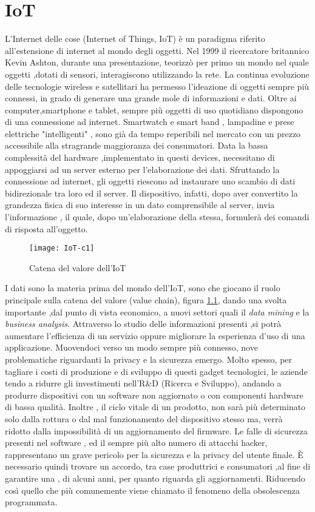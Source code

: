 \chapter{IoT}
L'Internet delle cose (Internet of Things, IoT) è un paradigma riferito
all’estensione di internet al mondo degli oggetti. Nel 1999 il ricercatore
britannico Kevin Ashton, durante una presentazione, teorizzò  per primo un mondo
nel quale oggetti ,dotati di sensori, interagiscono utilizzando la rete.  La
continua evoluzione delle tecnologie wireless e satellitari ha permesso
l'ideazione di oggetti sempre più connessi, in grado di generare una grande mole
di informazioni e dati. Oltre ai computer,smartphone e tablet, sempre più
oggetti di uso quotidiano dispongono di una connessione ad internet. Smartwatch
e smart band , lampadine e prese elettriche "intelligenti" ,  sono già da tempo
reperibili nel mercato\bx{,} con un prezzo accessibile alla stragrande maggioranza dei
consumatori.  Data la bassa
complessità del hardware ,implementato in questi devices, necessitano di
appoggiarsi ad un server esterno per l'elaborazione dei dati.  Sfruttando la
connessione ad internet, gli oggetti riescono ad instaurare uno scambio di dati
bidirezionale tra loro ed il server. Il dispositivo, infatti,  dopo aver
convertito la grandezza fisica di suo interesse in un dato comprensibile al
server, invia l'informazione , il quale, dopo un'elaborazione della
stessa, formulerà dei comandi di risposta all'oggetto.
\\
\begin{figure}[h]
        \centering 
                \texttt{[image: IoT-c1]}
        \caption{Catena del valore dell'IoT}
        \label{fig:IoT_chain}
\end{figure}
I dati sono la materia prima del mondo dell'IoT, sono  che giocano il ruolo
principale sulla catena del valore (value chain), figura \ref{fig:IoT_chain},
dando una svolta importante ,dal
punto di vista economico, a nuovi settori quali il \emph{data mining} e la
\emph{business analysis}.
Attraverso lo studio delle informazioni presenti ,si potrà  aumentare l’efficienza di un
servizio oppure  migliorare la esperienza d'uso di una applicazione.
Muovendoci verso un modo sempre più connesso, nove problematiche riguardanti la
privacy e la sicurezza emergo.  Molto spesso, per tagliare i costi di produzione e
di sviluppo di questi gadget tecnologici, le aziende tendo a ridurre gli
investimenti nell'R\&D (Ricerca e Sviluppo), andando a produrre dispositivi con
un software non aggiornato o con componenti hardware di bassa qualità. Inoltre
, il ciclo vitale di un prodotto, non sarà più determinato solo dalla
rottura o dal mal funzionamento del dispositivo stesso ma, verrà ridotto dalla
impossibilità di un aggiornamento del firmware.
Le falle di sicurezza presenti nel software , ed il sempre più alto numero di
attacchi hacker, rappresentano un grave  pericolo per la sicurezza e la privacy del utente
finale.
È necessario quindi trovare un accordo, tra case produttrici e
consumatori ,al fine di garantire una , di alcuni anni, per quanto
riguarda gli aggiornamenti. Riducendo così quello che più comunemente
viene chiamato il fenomeno della obsolescenza programmata. 
